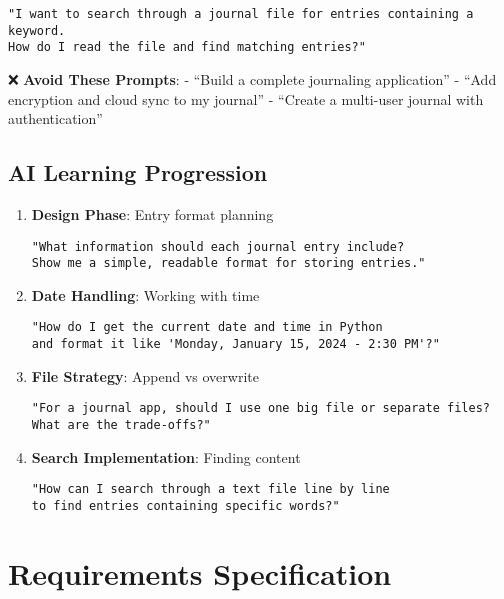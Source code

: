 \documentclass[
  letterpaper,
  DIV=11,
  numbers=noendperiod,
  oneside]{scrreprt}
\begin{document}
\begin{verbatim}
"I want to search through a journal file for entries containing a keyword. 
How do I read the file and find matching entries?"
\end{verbatim}

❌ \textbf{Avoid These Prompts}: - ``Build a complete journaling
application'' - ``Add encryption and cloud sync to my journal'' -
``Create a multi-user journal with authentication''

\subsection{AI Learning Progression}\label{ai-learning-progression-6}

\begin{enumerate}
\def\labelenumi{\arabic{enumi}.}
\item
  \textbf{Design Phase}: Entry format planning

\begin{verbatim}
"What information should each journal entry include? 
Show me a simple, readable format for storing entries."
\end{verbatim}
\item
  \textbf{Date Handling}: Working with time

\begin{verbatim}
"How do I get the current date and time in Python 
and format it like 'Monday, January 15, 2024 - 2:30 PM'?"
\end{verbatim}
\item
  \textbf{File Strategy}: Append vs overwrite

\begin{verbatim}
"For a journal app, should I use one big file or separate files? 
What are the trade-offs?"
\end{verbatim}
\item
  \textbf{Search Implementation}: Finding content

\begin{verbatim}
"How can I search through a text file line by line 
to find entries containing specific words?"
\end{verbatim}
\end{enumerate}

\section{Requirements Specification}\label{requirements-specification-6}
\end{document}
